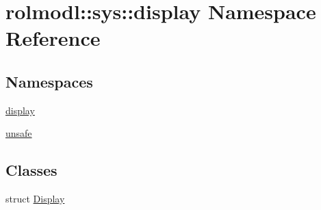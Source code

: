 \hypertarget{namespacerolmodl_1_1sys_1_1display}{}\section{rolmodl\+::sys\+::display Namespace Reference}
\label{namespacerolmodl_1_1sys_1_1display}
\subsection*{Namespaces}
\begin{DoxyCompactItemize}
\item 
 \mbox{\hyperlink{namespacerolmodl_1_1sys_1_1display_1_1display}{display}}
\item 
 \mbox{\hyperlink{namespacerolmodl_1_1sys_1_1display_1_1unsafe}{unsafe}}
\end{DoxyCompactItemize}
\subsection*{Classes}
\begin{DoxyCompactItemize}
\item 
struct \mbox{\hyperlink{structrolmodl_1_1sys_1_1display_1_1_display}{Display}}
\end{DoxyCompactItemize}
